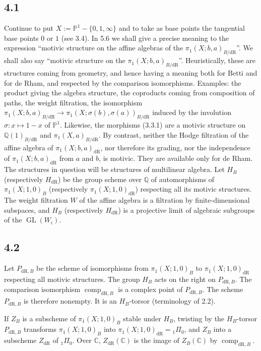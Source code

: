 \documentclass[11pt]{article}
\newcommand{\Q}{\mathbb Q}
\newcommand{\C}{\mathbb C}
\newcommand{\PP}{\mathbb P}
\newcommand{\GL}{\operatorname{GL}}
\newcommand{\comp}{\operatorname{comp}}
\newcommand{\dR}{\mathrm{dR}}
\begin{document}
\subsection*{4.1}
Continue to put $X:=\PP^1-\{0,1,\infty\}$ and to take as base points the tangential base points $0$ or $1$ (see 3.4).
In 5.6 we shall give a precise meaning to the expression ``motivic structure on the affine algebras of the $\pi_1(X;b,a)_{B/\dR}$''.
We shall also say ``motivic structure on the $\pi_1(X;b,a)_{B/\dR}$''.
Heuristically, these are structures coming from geometry, and hence having a meaning both for Betti and for de Rham, and respected by the comparison isomorphisms.
Examples: the product giving the algebra structure, the coproducts coming from composition of paths, the weight filtration, the isomorphism $\pi_1(X;b,a)_{B/\dR}\to\pi_1(X;\sigma(b),\sigma(a))_{B/\dR}$ induced by the involution $\sigma:x\mapsto1-x$ of $\PP^1$.
Likewise, the morphisms (3.3.1) are a motivic structure on $\Q(1)_{B/\dR}$ and $\pi_1(X,a)_{B/\dR}$.
By contrast, neither the Hodge filtration of the affine algebra of $\pi_1(X;b,a)_{\dR}$, nor therefore its grading, nor the independence of $\pi_1(X;b,a)_{\dR}$ from $a$ and $b$, is motivic.
They are available only for de Rham.
The structures in question will be structures of multilinear algebra.
Let $H_B$ (respectively $H_{\dR}$) be the group scheme over $\Q$ of automorphisms of $\pi_1(X;1,0)_B$ (respectively $\pi_1(X;1,0)_{\dR}$) respecting all its motivic structures.
The weight filtration $W$ of the affine algebra is a filtration by finite-dimensional subspaces, and $H_B$ (respectively $H_{\dR}$) is a projective limit of algebraic subgroups of the $\GL(W_i)$.

\subsection*{4.2}
Let $P_{\dR,B}$ be the scheme of isomorphisms from $\pi_1(X;1,0)_B$ to $\pi_1(X;1,0)_{\dR}$ respecting all motivic structures.
The group $H_B$ acts on the right on $P_{\dR,B}$.
The comparison isomorphism $\comp_{\dR,B}$ is a complex point of $P_{\dR,B}$.
The scheme $P_{\dR,B}$ is therefore nonempty.
It is an $H_B$-torsor (terminology of 2.2).

If $Z_B$ is a subscheme of $\pi_1(X;1,0)_B$ stable under $H_B$, twisting by the $H_B$-torsor $P_{\dR,B}$ transforms $\pi_1(X;1,0)_B$ into $\pi_1(X;1,0)_{\dR}={}_1\Pi_0$, and $Z_B$ into a subscheme $Z_{\dR}$ of ${}_1\Pi_0$.
Over $\C$, $Z_{\dR}(\C)$ is the image of $Z_B(\C)$ by $\comp_{\dR,B}$.
\end{document}
